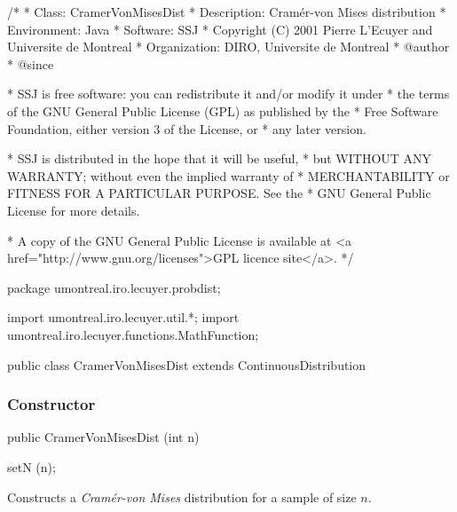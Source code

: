 \begin{code}
\begin{hide}
/*
 * Class:        CramerVonMisesDist
 * Description:  Cramér-von Mises distribution
 * Environment:  Java
 * Software:     SSJ 
 * Copyright (C) 2001  Pierre L'Ecuyer and Universite de Montreal
 * Organization: DIRO, Universite de Montreal
 * @author       
 * @since

 * SSJ is free software: you can redistribute it and/or modify it under
 * the terms of the GNU General Public License (GPL) as published by the
 * Free Software Foundation, either version 3 of the License, or
 * any later version.

 * SSJ is distributed in the hope that it will be useful,
 * but WITHOUT ANY WARRANTY; without even the implied warranty of
 * MERCHANTABILITY or FITNESS FOR A PARTICULAR PURPOSE.  See the
 * GNU General Public License for more details.

 * A copy of the GNU General Public License is available at
   <a href="http://www.gnu.org/licenses">GPL licence site</a>.
 */
\end{hide}
package umontreal.iro.lecuyer.probdist;
\begin{hide}
import umontreal.iro.lecuyer.util.*;
import umontreal.iro.lecuyer.functions.MathFunction;
\end{hide} 

public class CramerVonMisesDist extends ContinuousDistribution\begin{hide} {
   protected int n;

   private static class Function implements MathFunction {
      protected int n;
      protected double u;

      public Function (int n, double u) {
         this.n = n;
         this.u = u;
      }

      public double evaluate (double x) {
         return u - cdf(n,x);
      }
   }
\end{hide}
\end{code}
\subsubsection* {Constructor}

\begin{code}

   public CramerVonMisesDist (int n)\begin{hide} {
      setN (n);
   }\end{hide}
\end{code}
\begin{tabb}
 Constructs a {\em Cram\'er-von Mises\/} distribution for a sample of size $n$.
\end{tabb}

